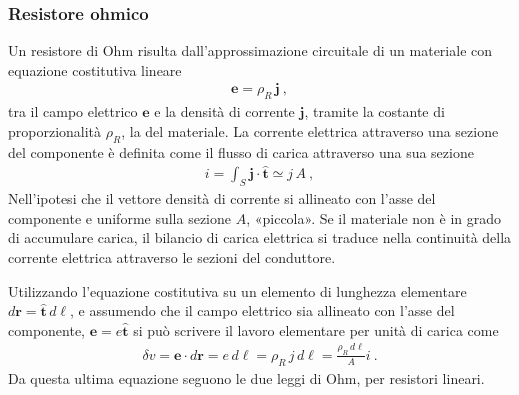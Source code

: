 \documentclass[letterpaper,10pt,italian]{jupyterBook}
\begin{document}
\subsubsection{Resistore ohmico}
\label{\detokenize{ch/circuits-electric-components:resistore-ohmico}}
\sphinxAtStartPar
Un resistore di Ohm risulta dall’approssimazione circuitale di un materiale con equazione costitutiva lineare
\begin{equation*}
\begin{split}\mathbf{e} = \rho_R \, \mathbf{j} \ ,\end{split}
\end{equation*}
\sphinxAtStartPar
tra il campo elettrico \(\mathbf{e}\) e la densità di corrente \(\mathbf{j}\), tramite la costante di proporzionalità \(\rho_R\), la  del materiale. La corrente elettrica attraverso una sezione del componente è definita come il flusso di carica attraverso una sua sezione
\begin{equation*}
\begin{split}i = \int_S \mathbf{j} \cdot \hat{\mathbf{t}} \simeq j \, A \ ,\end{split}
\end{equation*}
\sphinxAtStartPar
Nell’ipotesi che il vettore densità di corrente si allineato con l’asse del componente e uniforme sulla sezione \(A\), «piccola».
Se il materiale non è in grado di accumulare carica, il bilancio di carica elettrica si traduce nella continuità della corrente elettrica attraverso le sezioni del conduttore.

\sphinxAtStartPar
Utilizzando l’equazione costitutiva su un elemento di lunghezza elementare \(d\mathbf{r} =\hat{\mathbf{t}} \, d \ell \), e assumendo che il campo elettrico sia allineato con l’asse del componente, \(\mathbf{e} = e \hat{\mathbf{t}}\) si può scrivere il lavoro elementare per unità di carica come
\begin{equation*}
\begin{split}\delta v = \mathbf{e} \cdot d \mathbf{r} =  e \, d\ell = \rho_R \, j \, d\ell =  \frac{\rho_R \, d\ell}{A} i \ .\end{split}
\end{equation*}
\sphinxAtStartPar
Da questa ultima equazione seguono le due leggi di Ohm, per resistori lineari.
\end{document}
